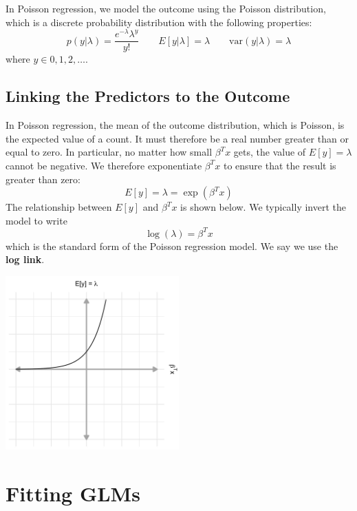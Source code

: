 In Poisson regression, we model the outcome using the Poisson distribution, which is a discrete probability distribution with the following properties:
$$ p(y | \lambda) = \frac{e^{-\lambda} \lambda^y}{y!} \qquad E[y|\lambda] = \lambda \qquad \text{var}(y|\lambda) = \lambda $$
where $y \in 0, 1, 2, \dots$.

\subsection{Linking the Predictors to the Outcome}

In Poisson regression, the mean of the outcome distribution, which is Poisson, is the expected value of a count. It must therefore be a real number greater than or equal to zero. In particular, no matter how small $\beta^T x$ gets, the value of $E[y] = \lambda$ cannot be negative. We therefore exponentiate $\beta^T x$ to ensure that the result is greater than zero:
\begin{equation} E[y] = \lambda = \exp(\beta^T x) \label{eqn:meanpoisson} \end{equation}
The relationship between $E[y]$ and $\beta^T x$ is shown below. We typically invert the model to write
$$ \log(\lambda) = \beta^T x $$
which is the standard form of the Poisson regression model. We say we use the \textbf{log link}. 

\begin{center}
\includegraphics[width=0.5\textwidth]{img/l02-figure3-poisson.png}
\end{center}


\section{Fitting GLMs}

